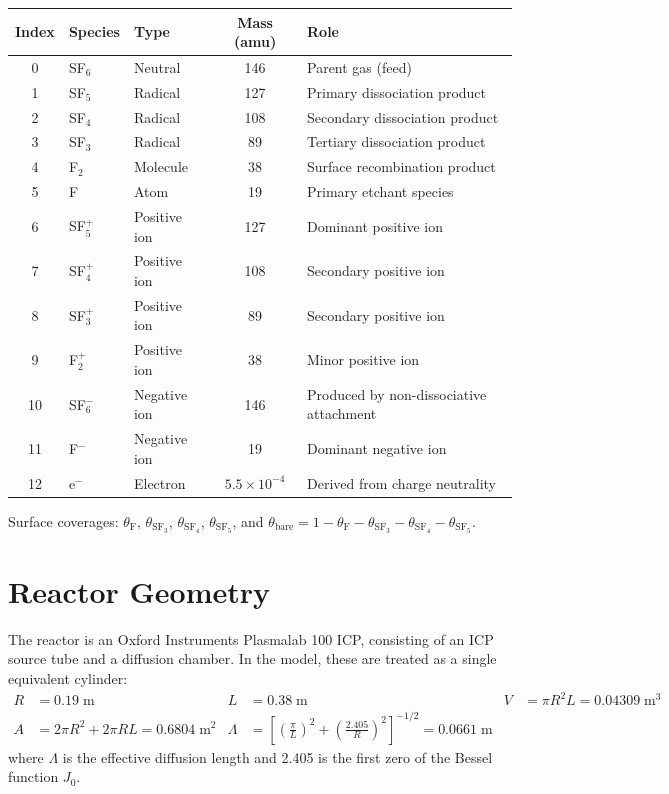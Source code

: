 \documentclass[11pt,a4paper]{article}
\begin{document}
\begin{table}[H]
\centering
\begin{tabular}{cllcl}
\toprule
\textbf{Index} & \textbf{Species} & \textbf{Type} & \textbf{Mass (amu)} & \textbf{Role} \\
\midrule
0 & SF$_6$ & Neutral & 146 & Parent gas (feed) \\
1 & SF$_5$ & Radical & 127 & Primary dissociation product \\
2 & SF$_4$ & Radical & 108 & Secondary dissociation product \\
3 & SF$_3$ & Radical & 89 & Tertiary dissociation product \\
4 & F$_2$ & Molecule & 38 & Surface recombination product \\
5 & F & Atom & 19 & Primary etchant species \\
6 & SF$_5^+$ & Positive ion & 127 & Dominant positive ion \\
7 & SF$_4^+$ & Positive ion & 108 & Secondary positive ion \\
8 & SF$_3^+$ & Positive ion & 89 & Secondary positive ion \\
9 & F$_2^+$ & Positive ion & 38 & Minor positive ion \\
10 & SF$_6^-$ & Negative ion & 146 & Produced by non-dissociative attachment \\
11 & F$^-$ & Negative ion & 19 & Dominant negative ion \\
12 & e$^-$ & Electron & $5.5\times10^{-4}$ & Derived from charge neutrality \\
\bottomrule
\end{tabular}
\end{table}

Surface coverages: $\theta_\text{F}$, $\theta_{\text{SF}_3}$, $\theta_{\text{SF}_4}$, $\theta_{\text{SF}_5}$, and $\theta_\text{bare} = 1 - \theta_\text{F} - \theta_{\text{SF}_3} - \theta_{\text{SF}_4} - \theta_{\text{SF}_5}$.

\section{Reactor Geometry}

The reactor is an Oxford Instruments Plasmalab 100 ICP, consisting of an ICP source tube and a diffusion chamber. In the model, these are treated as a single equivalent cylinder:
\begin{align}
R &= 0.19\;\text{m} & L &= 0.38\;\text{m} & V &= \pi R^2 L = 0.04309\;\text{m}^3 \\
A &= 2\pi R^2 + 2\pi RL = 0.6804\;\text{m}^2 & \Lambda &= \left[\left(\frac{\pi}{L}\right)^2 + \left(\frac{2.405}{R}\right)^2\right]^{-1/2} = 0.0661\;\text{m}
\end{align}
where $\Lambda$ is the effective diffusion length and 2.405 is the first zero of the Bessel function $J_0$.
\end{document}
